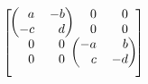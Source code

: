 \documentclass[nofonts]{ctexart}
\begin{document}
	\[
		\left[
			\begin{blockarray}{*4r}
				\begin{block}{(rr)rr}
					a	& -b	& 0	& 0	\\
					-c	& d		& 0	& 0	\\
				\end{block}
				\begin{block}{rr(rr)}
					0	& 0	& -a	& b	\\
					0	& 0	& c		& -d\\
				\end{block}
			\end{blockarray}
		\right]
	\]
\end{document}
